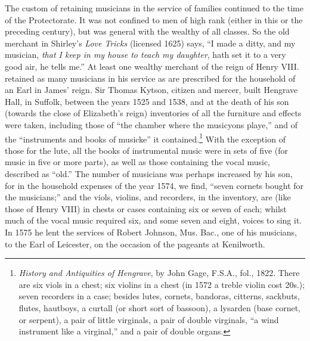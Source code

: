The custom of retaining musicians in the service of families continued to the
time of the Protectorate. It was not confined to men of high rank (either in this
or the preceding century), but was general \pagebreak with the wealthy of all classes.
So the old merchant in Shirley’s \textit{Love Tricks} (licensed 1625) says, “I made a
ditty, and my musician, \textit{that I keep in my house to teach my daughter}, hath set it
to a very good air, he tells me.” At least one wealthy merchant of the reign of
Henry VIII. retained as many musicians in his service as are prescribed for the
household of an Earl in James’ reign. Sir Thomas Kytson, citizen and mercer,
built Hengrave Hall, in Suffolk, between the years 1525 and 1538, and at the
death of his son (towards the close of Elizabeth’s reign) inventories of all the furniture
and effects were taken, including those of “the chamber where the musicyons
playe,” and of the “instruments and books of musicke” it contained.\footnote{\textit{}
\textit{History and Antiquities of Hengrave}, by John Gage,
F.S.A., fol., 1822. There are six viols in a chest; six
violins in a chest (in 1572 a treble violin cost 20s.); seven
recorders in a case; besides lutes, cornets, bandoras,
citterns, sackbuts, flutes, hautboys, a curtall (or short sort
of bassoon), a lysarden (base cornet, or serpent), a pair of
little virginals, a pair of double virginals, “a wind instrument
like a virginal,” and a pair of double organs.}
With the
exception of those for the lute, all the books of instrumental music were in sets of
five (for music in five or more parts), as well as those containing the vocal music,
described as “old.” The number of musicians was perhaps increased by his son,
for in the household expenses of the year 1574, we find, “seven cornets bought
for the musicians;” and the viols, violins, and recorders, in the inventory, are
(like those of Henry VIII) in chests or cases containing six or seven of each;
whilst much of the vocal music required six, and some seven and eight, voices
to sing it. In 1575 he lent the services of Robert Johnson, Mus. Bac., one of
his musicians, to the Earl of Leicester, on the occasion of the pageants at
Kenilworth.

